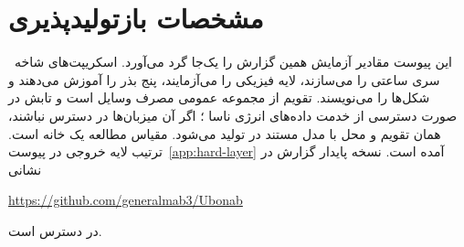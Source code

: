 \chapter{مشخصات بازتولیدپذیری}
\label{app:reproducibility}

این پیوست مقادیر آزمایش همین گزارش را یک‌جا گرد می‌آورد. اسکریپت‌های شاخه~ سری ساعتی را می‌سازند، لایه فیزیکی را می‌آزمایند، پنج بذر را آموزش می‌دهند و شکل‌ها را می‌نویسند. تقویم از مجموعه عمومی مصرف وسایل است  و تابش در صورت دسترسی از خدمت داده‌های انرژی ناسا ؛ اگر آن میزبان‌ها در دسترس نباشند، همان تقویم و محل با مدل مستند در  تولید می‌شود. مقیاس مطالعه یک خانه است. ترتیب لایه خروجی در پیوست~\ref{app:hard-layer} آمده است. نسخه پایدار گزارش در نشانی
\begin{latin}
\noindent\url{https://github.com/generalmab3/Ubonab}
\end{latin}
در دسترس است.

